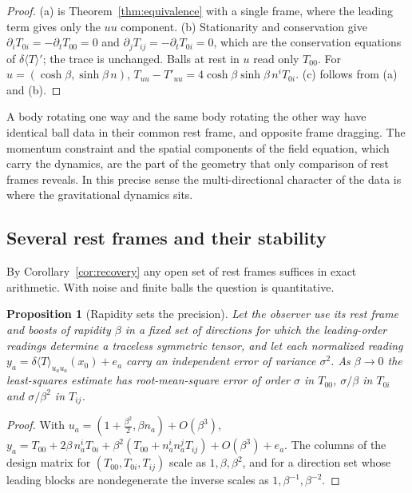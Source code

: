 \documentclass[12pt]{article}
\newtheorem{proposition}[theorem]{Proposition}
\theoremstyle{definition}
\theoremstyle{remark}
\newcommand{\dT}{\delta\langle T\rangle}
\begin{document}
\begin{proof}
(a) is Theorem~\ref{thm:equivalence} with a single frame, where the leading term gives only
the \(uu\) component. (b) Stationarity and conservation give
\(\partial_iT_{0i}=-\partial_tT_{00}=0\) and \(\partial_jT_{ij}=-\partial_tT_{0i}=0\), which
are the conservation equations of \(\dT'\); the trace is unchanged. Balls at rest in \(u\)
read only \(T_{00}\). For \(u=(\cosh\beta,\sinh\beta\,n)\),
\(T_{uu}-T'_{uu}=4\cosh\beta\sinh\beta\,n^iT_{0i}\). (c) follows from (a) and
(b).
\end{proof}

A body rotating one way and the same body rotating the other way have identical ball data
in their common rest frame, and opposite frame dragging. The momentum constraint and the
spatial components of the field equation, which carry the dynamics, are the part of the
geometry that only comparison of rest frames reveals. In this precise sense the
multi-directional character of the data is where the gravitational dynamics sits.

\subsection{Several rest frames and their stability}\label{subsec:stability}

By Corollary~\ref{cor:recovery} any open set of rest frames suffices in exact arithmetic.
With noise and finite balls the question is quantitative.

\begin{proposition}[Rapidity sets the precision]\label{prop:stability}
Let the observer use its rest frame and boosts of rapidity \(\beta\) in a fixed set of
directions for which the leading-order readings determine a traceless symmetric tensor,
and let each normalized reading \(y_a=\dT_{u_au_a}(x_0)+e_a\) carry an independent error of
variance \(\sigma^2\). As \(\beta\to0\) the least-squares estimate has root-mean-square
error of order \(\sigma\) in \(T_{00}\), \(\sigma/\beta\) in \(T_{0i}\) and \(\sigma/\beta^2\)
in \(T_{ij}\).
\end{proposition}

\begin{proof}
With \(u_a=(1+\frac{\beta^2}2,\beta n_a)+O(\beta^3)\),
\(y_a=T_{00}+2\beta\,n_a^iT_{0i}+\beta^2(T_{00}+n_a^in_a^jT_{ij})+O(\beta^3)+e_a\). The columns
of the design matrix for \((T_{00},T_{0i},T_{ij})\) scale as \(1,\beta,\beta^2\), and for a
direction set whose leading blocks are nondegenerate the inverse scales as
\(1,\beta^{-1},\beta^{-2}\).
\end{proof}
\end{document}
